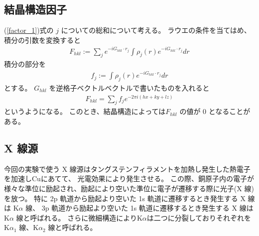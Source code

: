 \documentclass[11pt,dvipdfmx,a4paper]{jsarticle}
\begin{document}
\subsection{結晶構造因子}
(\ref{factor_1})式の \(j\) についての総和について考える。
ラウエの条件を当てはめ、積分の引数を変換すると
\begin{align}
	F_{hkl} := \sum_j e^{-iG_{hkl}\cdot r_j} \int \rho_j(r) e^{-iG_{hkl}\cdot r_j}dr
\end{align}
積分の部分を
\begin{align}
	f_j :=\int \rho_j(r) e^{-iG_{hkl}\cdot r_j}dr
\end{align}
とする。
\(G_{hkl}\) を逆格子ベクトルベクトルで書いたものを入れると
\begin{align}
	F_{hkl} = \sum_j f_j e^{-2\pi i (hx + ky + lz)}
\end{align}
というようになる。
このとき、結晶構造によっては\(F_{hkl}\) の値が 0 となることがある。

\subsection{X 線源}
今回の実験で使う X 線源はタングステンフィラメントを加熱し発生した熱電子を加速しCuにあてて、
光電効果により発生させる。
この際、銅原子内の電子が様々な準位に励起され、励起により空いた準位に電子が遷移する際に光子(X 線)を放つ。
特に
2p 軌道から励起より空いた 1s 軌道に遷移するとき発生する X 線は K\(\alpha\) 線、
3p 軌道から励起より空いた 1s 軌道に遷移するとき発生する X 線は K\(\alpha\) 線と呼ばれる。
さらに微細構造によりK\(\alpha\)は二つに分裂しておりそれぞれを
K\(\alpha_1\) 線、K\(\alpha_2\) 線と呼ばれる。
\end{document}
